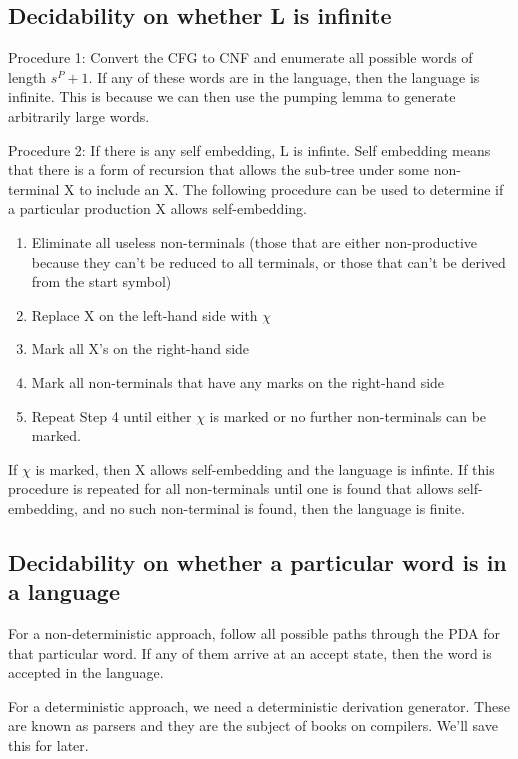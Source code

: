 \documentclass[letterpaper,12pt,openany,reqno]{book}%
\begin{document}
\subsection{Decidability on whether L is infinite}
Procedure 1: Convert the CFG to CNF and enumerate all possible words of length $s^P+1$. If any of these words are in the language, then the language is infinite. This is because we can then use the pumping lemma to generate arbitrarily large words.

Procedure 2: If there is any self embedding, L is infinte. Self embedding means that there is a form of recursion that allows the sub-tree under some non-terminal X to include an X. The following procedure can be used to determine if a particular production X allows self-embedding.
\begin{enumerate}
\item Eliminate all useless non-terminals (those that are either non-productive because they can't be reduced to all terminals, or those that can't be derived from the start symbol)
\item Replace X on the left-hand side with $\chi$
\item Mark all X's on the right-hand side
\item Mark all non-terminals that have any marks on the right-hand side
\item Repeat Step 4 until either $\chi$ is marked or no further non-terminals can be marked.
\end{enumerate}
If $\chi$ is marked, then X allows self-embedding and the language is infinte. If this procedure is repeated for all non-terminals until one is found that allows self-embedding, and no such non-terminal is found, then the language is finite.

\subsection {Decidability on whether a particular word is in a language}
For a non-deterministic approach, follow all possible paths through the PDA for that particular word. If any of them arrive at an accept state, then the word is accepted in the language.

For a deterministic approach, we need a deterministic derivation generator. These are known as parsers and they are the subject of books on compilers. We'll save this for later.
\end{document}

